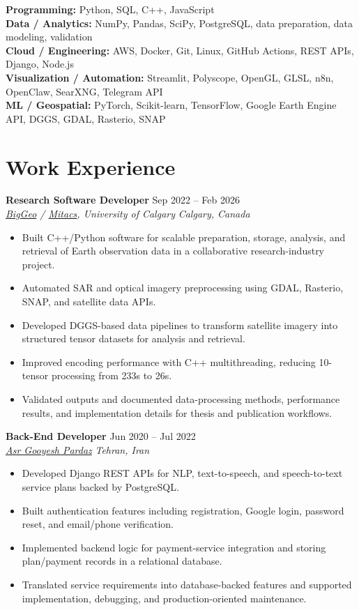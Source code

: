 \documentclass[a4paper,10pt]{article}
\newcommand{\resumeSubheading}[4]{
    \textbf{#1} \hfill #2 \\
    \textit{#3} \hfill \textit{#4}
}
\begin{document}
\textbf{Programming:} Python, SQL, C++, JavaScript \\
\textbf{Data / Analytics:} NumPy, Pandas, SciPy, PostgreSQL, data preparation, data modeling, validation \\
\textbf{Cloud / Engineering:} AWS, Docker, Git, Linux, GitHub Actions, REST APIs, Django, Node.js \\
\textbf{Visualization / Automation:} Streamlit, Polyscope, OpenGL, GLSL, n8n, OpenClaw, SearXNG, Telegram API \\
\textbf{ML / Geospatial:} PyTorch, Scikit-learn, TensorFlow, Google Earth Engine API, DGGS, GDAL, Rasterio, SNAP


\section*{Work Experience}

\resumeSubheading
{Research Software Developer}
{Sep 2022 -- Feb 2026}
{\href{https://biggeo.com}{BigGeo} / \href{https://www.mitacs.ca/}{Mitacs}, University of Calgary}
{Calgary, Canada}
\begin{itemize}[leftmargin=0.25in]
    \item Built C++/Python software for scalable preparation, storage, analysis, and retrieval of Earth observation data in a collaborative research-industry project.
    \item Automated SAR and optical imagery preprocessing using GDAL, Rasterio, SNAP, and satellite data APIs.
    \item Developed DGGS-based data pipelines to transform satellite imagery into structured tensor datasets for analysis and retrieval.
    \item Improved encoding performance with C++ multithreading, reducing 10-tensor processing from 233s to 26s.
    \item Validated outputs and documented data-processing methods, performance results, and implementation details for thesis and publication workflows.
\end{itemize}

\resumeSubheading
{Back-End Developer}
{Jun 2020 -- Jul 2022}
{\href{https://asr-gooyesh.com/en/}{Asr Gooyesh Pardaz}}
{Tehran, Iran}
\begin{itemize}[leftmargin=0.25in]
    \item Developed Django REST APIs for NLP, text-to-speech, and speech-to-text service plans backed by PostgreSQL.
    \item Built authentication features including registration, Google login, password reset, and email/phone verification.
    \item Implemented backend logic for payment-service integration and storing plan/payment records in a relational database.
    \item Translated service requirements into database-backed features and supported implementation, debugging, and production-oriented maintenance.
\end{itemize}
\end{document}
